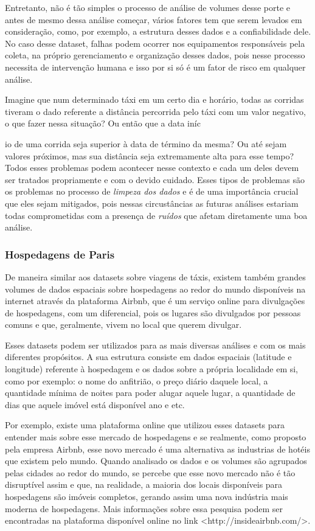 Entretanto, não é tão simples o processo de análise de volumes desse porte e antes de mesmo dessa análise começar, vários fatores tem que serem levados em consideração, como, por exemplo, a estrutura desses dados e a confiabilidade dele. No caso desse dataset, falhas podem ocorrer nos equipamentos responsáveis pela coleta, na próprio gerenciamento e organização desses dados, pois nesse processo necessita de intervenção humana e isso por si só é um fator de risco em qualquer análise.

Imagine que num determinado táxi em um certo dia e horário, todas as corridas tiveram o dado referente a distância percorrida pelo táxi com um valor negativo, o que fazer nessa situação? Ou então que a data iníc

io de uma corrida seja superior à data de término da mesma? Ou até sejam valores próximos, mas sua distância seja extremamente alta para esse tempo? Todos esses problemas podem acontecer nesse contexto e cada um deles devem ser tratados propriamente e com o devido cuidado. Esses tipos de problemas são os problemas no processo de \textit{limpeza dos dados} e é de uma importância crucial que eles sejam mitigados, pois nessas circustâncias as futuras análises estariam todas comprometidas com a presença de \textit{ruídos} que afetam diretamente uma boa análise.

\subsubsection{Hospedagens de Paris}

De maneira similar aos datasets sobre viagens de táxis, existem também grandes volumes de dados espaciais sobre hospedagens ao redor do mundo disponíveis na internet através da plataforma Airbnb,
que é um serviço online para divulgações de hospedagens, com um diferencial, pois os lugares são divulgados por pessoas comuns e que, geralmente, vivem no local que querem divulgar.

Esses datasets podem ser utilizados para as mais diversas análises e com os mais diferentes propósitos. A sua estrutura consiste em dados espaciais (latitude e longitude) referente à hospedagem e os dados sobre a própria localidade em si, como por exemplo: o nome do anfitrião, o preço diário daquele local, a quantidade mínima de noites para poder alugar aquele lugar, a quantidade de dias que aquele imóvel está disponível ano e etc.

Por exemplo, existe uma plataforma online que utilizou esses datasets para entender mais sobre esse mercado de hospedagens e se realmente, como proposto pela empresa Airbnb, esse novo mercado é uma alternativa as industrias de hotéis que existem pelo mundo. Quando analisado os dados e os volumes são agrupados pelas cidades ao redor do mundo, se percebe que esse novo mercado não é tão disruptível assim e que, na realidade, a maioria dos locais disponíveis para hospedagens são imóveis completos, gerando assim uma nova indústria mais moderna de hospedagens. Mais informações sobre essa pesquisa podem ser encontradas na plataforma disponível online no link <http://insideairbnb.com/>.


